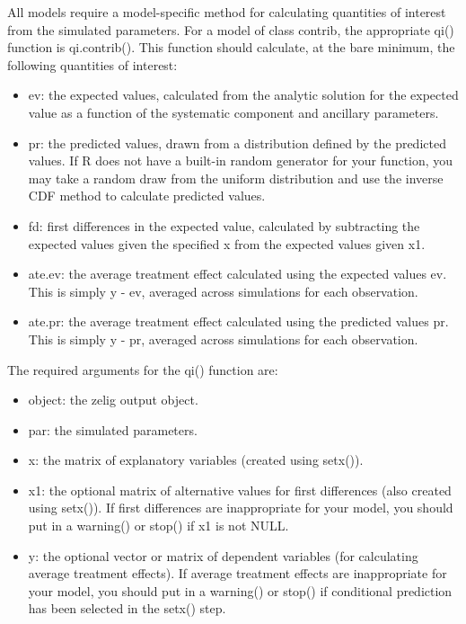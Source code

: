 \documentclass[letterpaper,10pt,english]{sphinxmanual}
\begin{document}
All models require a model-specific method for calculating quantities of
interest from the simulated parameters. For a model of class contrib,
the appropriate qi() function is qi.contrib(). This function should
calculate, at the bare minimum, the following quantities of interest:
\begin{itemize}
\item {} 
ev: the expected values, calculated from the analytic solution for
the expected value as a function of the systematic component and
ancillary parameters.

\item {} 
pr: the predicted values, drawn from a distribution defined by the
predicted values. If R does not have a built-in random generator for
your function, you may take a random draw from the uniform
distribution and use the inverse CDF method to calculate predicted
values.

\item {} 
fd: first differences in the expected value, calculated by
subtracting the expected values given the specified x from the
expected values given x1.

\item {} 
ate.ev: the average treatment effect calculated using the expected
values ev. This is simply y - ev, averaged across simulations for
each observation.

\item {} 
ate.pr: the average treatment effect calculated using the predicted
values pr. This is simply y - pr, averaged across simulations for
each observation.

\end{itemize}

The required arguments for the qi() function are:
\begin{itemize}
\item {} 
object: the zelig output object.

\item {} 
par: the simulated parameters.

\item {} 
x: the matrix of explanatory variables (created using setx()).

\item {} 
x1: the optional matrix of alternative values for first differences
(also created using setx()). If first differences are inappropriate
for your model, you should put in a warning() or stop() if x1 is not
NULL.

\item {} 
y: the optional vector or matrix of dependent variables (for
calculating average treatment effects). If average treatment effects
are inappropriate for your model, you should put in a warning() or
stop() if conditional prediction has been selected in the setx()
step.

\end{itemize}
\end{document}
